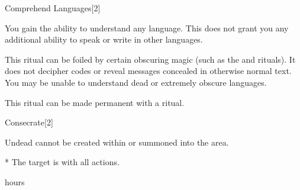 \begin{spellsection}{Comprehend Languages}[2]
    \begin{spellheader}
    \end{spellheader}
    \begin{spellcontent}
        \begin{spelltargetinginfo}
        \end{spelltargetinginfo}
        \begin{spelleffects}

            \spelleffect You gain the ability to understand any language. This does not grant you any additional ability to speak or write in other languages.
            \spelldur \durlong
        \end{spelleffects}
    \end{spellcontent}
    \begin{spellfooter}
        \spellnotes This ritual can be foiled by certain obscuring magic (such as the  and  rituals). It does not decipher codes or reveal messages concealed in otherwise normal text. You may be unable to understand dead or extremely obscure languages.

        This ritual can be made permanent with a  ritual.
    \end{spellfooter}
\end{spellsection}

\begin{spellsection}{Consecrate}[2]
    \begin{spellheader}
    \end{spellheader}
    \begin{spellcontent}
        \begin{spelltargetinginfo}
        \end{spelltargetinginfo}
        \begin{spelleffects}

            \spellline
            \spelleffect Undead cannot be created within or summoned into the area.
            \begin{spelltarget}*
                \spelleffect The target is \impaired with all actions.
            \end{spelltarget}
             hours
        \end{spelleffects}
    \end{spellcontent}
    \begin{spellfooter}
    \end{spellfooter}
\end{spellsection}

